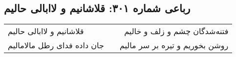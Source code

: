 \begin{center}
\section*{رباعی شماره ۳۰۱: قلاشانیم و لاابالی حالیم}
\label{sec:sh301}
\begin{longtable}{l p{0.5cm} r}
قلاشانیم و لاابالی حالیم
&&
فتنه‌شدگان چشم و زلف و خالیم
\\
جان داده فدای رطل مالامالیم
&&
روشن بخوریم و تیره بر سر مالیم
\\
\end{longtable}
\end{center}
